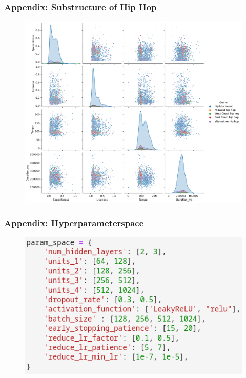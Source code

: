 \documentclass[8pt]{beamer}
\begin{document}
\begin{frame}
    \frametitle{Appendix: Substructure of Hip Hop}
    \begin{figure}
        \includegraphics[scale=0.3]{figures/pairplot_hip_v3.pdf}
    \end{figure}
\end{frame}
\begin{frame}
  \frametitle{Appendix: Hyperparameterspace}
  \begin{figure}
      \includegraphics[scale=0.4]{figures/paramspace.png}
  \end{figure}
\end{frame}
\end{document}
